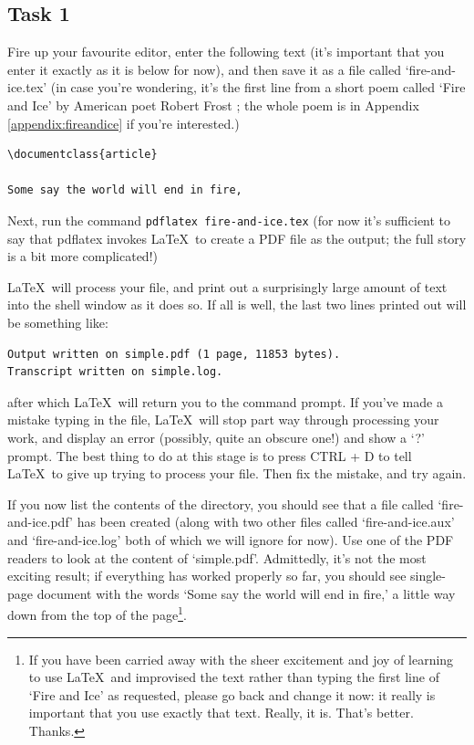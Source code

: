 \subsection{Task 1}
\label{sec:task-1}


Fire up your favourite editor, enter the following text (it's important that you enter it exactly as it is below for now), and then save it as a file called `fire-and-ice.tex' (in case you're wondering, it's the first line from a short poem called `Fire and Ice' by American poet Robert Frost \citep{frost1923}; the whole poem is in Appendix \ref{appendix:fireandice} if you're interested.)

\begin{verbatim}
\documentclass{article}

Some say the world will end in fire,

\end{verbatim}
%
Next, run the command \texttt{pdflatex fire-and-ice.tex} (for now it's sufficient to say that pdflatex invokes \LaTeX\ to create a PDF file as the output; the full story is a bit more complicated!)

\LaTeX\ will process your file, and print out a surprisingly large amount of text into the shell window as it does so. If all is well, the last two lines printed out will be something like:

\begin{verbatim}
Output written on simple.pdf (1 page, 11853 bytes).
Transcript written on simple.log.
\end{verbatim}
%
after which \LaTeX\ will return you to the command prompt. If you've made a mistake typing in the file, \LaTeX\ will stop part way through processing your work, and display an error (possibly, quite an obscure one!) and show a `?' prompt. The best thing to do at this stage is to press CTRL + D to tell \LaTeX\ to give up trying to process your file. Then fix the mistake, and try again.  

If you now list the contents of the directory, you should see that a file called `fire-and-ice.pdf' has been created (along with two other files called `fire-and-ice.aux' and `fire-and-ice.log' both of which we will ignore for now). Use one of the PDF readers to look at the content of `simple.pdf'.  Admittedly, it's not the most exciting result; if everything has worked properly so far, you should see single-page document with the words `Some say the world will end in fire,' a little way down from the top of the page\footnote{If you have been carried away with the sheer excitement and joy of learning to use \LaTeX\, and improvised the text rather than typing the first line of `Fire and Ice' as requested, please go back and change it now: it really is important that you use exactly that text. Really, it is. That's better. Thanks.}.

